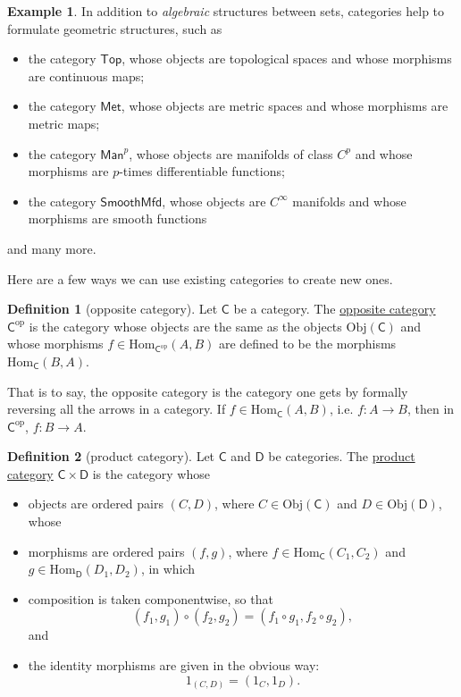 \documentclass[a4paper,10pt]{scrreprt}
\newcommand{\defn}[1]{\ul{#1}}
\newcommand{\Obj}{\mathrm{Obj}}
\newcommand{\Hom}{\mathrm{Hom}}
\theoremstyle{definition}
\newtheorem{definition}{Definition}[section]
\newtheorem{example}{Example}[section]
\theoremstyle{plain}
\theoremstyle{remark}
\begin{document}
\begin{example}
  \label{eg:moreexamplesofcategories}
  In addition to \emph{algebraic} structures between sets, categories help to formulate geometric structures, such as
  \begin{itemize}
    \item the category $\mathsf{Top}$, whose objects are topological spaces and whose morphisms are continuous maps;
    \item the category $\mathsf{Met}$, whose objects are metric spaces and whose morphisms are metric maps;
    \item the category $\mathsf{Man}^{p}$, whose objects are manifolds of class $C^{p}$ and whose morphisms are $p$-times differentiable functions;

    \item the category $\mathsf{SmoothMfd}$, whose objects are $C^{\infty}$ manifolds and whose morphisms are smooth functions
  \end{itemize}
  and many more.
\end{example}

Here are a few ways we can use existing categories to create new ones.
\begin{definition}[opposite category]
  \label{def:oppositecategory}
  Let $\mathsf{C}$ be a category. The \defn{opposite category} $\mathsf{C}^{\mathrm{op}}$ is the category whose objects are the same as the objects $\Obj(\mathsf{C})$ and whose morphisms $f \in \Hom_{\mathsf{C}^{\mathrm{op}}}(A, B)$ are defined to be the morphisms $\Hom_{\mathsf{C}}(B, A)$.

  That is to say, the opposite category is the category one gets by formally reversing all the arrows in a category. If $f \in \Hom_{\mathsf{C}}(A, B)$, i.e. $f \colon A \to B$, then in $\mathsf{C}^{\mathrm{op}}$, $f\colon B \to A$. 
\end{definition} 

\begin{definition}[product category]
  \label{def:productcategory}
  Let $\mathsf{C}$ and $\mathsf{D}$ be categories. The \defn{product category} $\mathsf{C} \times \mathsf{D}$ is the category whose 
  \begin{itemize}
    \item objects are ordered pairs $(C, D)$, where $C \in \Obj(\mathsf{C})$ and $D \in \Obj(\mathsf{D})$, whose
    \item morphisms are ordered pairs $(f,g)$, where $f \in \Hom_{\mathsf{C}}(C_{1}, C_{2})$ and $g \in \Hom_{\mathsf{D}}(D_{1}, D_{2})$, in which
    \item composition is taken componentwise, so that
      \begin{equation*}
        (f_{1}, g_{1}) \circ (f_{2},g_{2}) = (f_{1} \circ g_{1}, f_{2} \circ g_{2}),
      \end{equation*}
      and
    \item the identity morphisms are given in the obvious way:
      \begin{equation*}
        1_{(C,D)} = (1_{C}, 1_{D}).
      \end{equation*}
  \end{itemize}
\end{definition}
\end{document}
